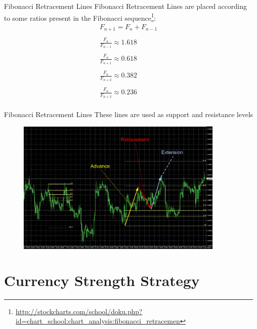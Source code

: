 \documentclass[12pt,portuguese]{beamer}
\begin{document}
\begin{frame}{Fibonacci Retracement Lines}
	Fibonacci Retracement Lines are placed according to some ratios present in the Fibonacci sequence\footnote{\url{http://stockcharts.com/school/doku.php?id=chart_school:chart_analysis:fibonacci_retracemen}}:
\begin{equation*}
\begin{array}{rcl}
	F_{n+1} = F_n + F_{n-1}\\
	\\
	\frac{F_n}{F_{n-1}} \approx 1.618 \\
	\\
	\frac{F_n}{F_{n+1}} \approx 0.618 \\
	\\
	\frac{F_n}{F_{n+2}} \approx 0.382 \\
	\\
	\frac{F_n}{F_{n+3}} \approx 0.236 \\
\end{array}
\end{equation*}
\end{frame}
	
\begin{frame}{Fibonacci Retracement Lines}
	These lines are used as support and resistance levels
	\begin{figure}[h]
	\centering
	\includegraphics[width=0.9\textwidth]{images/mt4_fibo.pdf}
	\end{figure}
\end{frame}

\section{Currency Strength Strategy}
\end{document}
